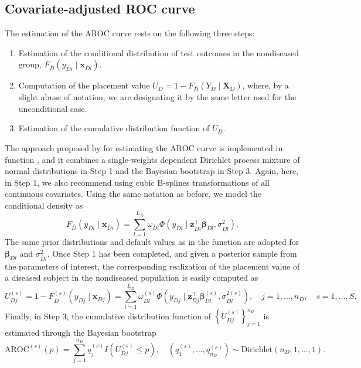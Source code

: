 \subsection{Covariate-adjusted ROC curve}\label{sec:AROC}
The estimation of the AROC curve rests on the following three steps:
\begin{enumerate}
\item Estimation of the conditional distribution of test outcomes in the nondiseased group, $F_{\bar{D}}(y_{\bar{D}i}\mid\mathbf{x}_{\bar{D}i})$.
\item Computation of the placement value $U_D=1-F_{\bar{D}}(Y_D\mid\mathbf{X}_D)$, where, by a slight abuse of notation, we are designating it by the same letter used for the unconditional case.
\item Estimation of the cumulative distribution function of $U_D$. 
\end{enumerate}	
The approach proposed by \cite{Inacio18} for estimating the AROC curve is implemented in function , and it combines a single-weights dependent Dirichlet process mixture of normal distributions in Step 1 and the Bayesian bootstrap in Step 3. Again, here, in Step 1, we also recommend using cubic B-splines transformations of all continuous covariates. Using the same notation as before, we model the conditional density as
\begin{equation*}
F_{\bar{D}}(y_{\bar{D}i}\mid\mathbf{x}_{\bar{D}i})=\sum_{l=1}^{L_{\bar{D}}}\omega_{\bar{D}l}\Phi(y_{\bar{D}i}\mid\mathbf{z}_{\bar{D}i}^{\top}\boldsymbol{\beta}_{\bar{D}l},\sigma_{\bar{D}l}^2).
\end{equation*}
The same prior distributions and default values as in the  function are adopted for $\boldsymbol{\beta}_{\bar{D}l}$ and $\sigma_{\bar{D}l}^2$. Once Step 1 has been completed, and given a posterior sample from the parameters of interest, the corresponding realization of the placement value of a diseased subject in the nondiseased population is easily computed as
\begin{equation*}
U_{Dj}^{(s)}=1-F_{\bar{D}}^{(s)}(y_{Dj}\mid\mathbf{x}_{Dj})=\sum_{l=1}^{L_{\bar{D}}}\omega_{\bar{D}l}^{(s)}\Phi\left(y_{Dj}\mid\mathbf{z}_{Dj}^{\top}\boldsymbol{\beta}_{\bar{D}l}^{(s)},\sigma_{\bar{D}l}^{2(s)}\right), \quad j =1,\ldots,n_D,\quad s=1,\ldots, S.
\end{equation*}
Finally, in Step 3, the cumulative distribution function of $\left\{U_{Dj}^{(s)}\right\}_{j=1}^{n_D}$ is estimated through the Bayesian bootstrap
\begin{equation*}
\text{AROC}^{(s)}(p)=\sum_{j=1}^{n_D}q_{j}^{(s)}I\left(U_{Dj}^{(s)}\leq p\right),\quad (q_{1}^{(s)},\ldots,q_{n_{D}}^{(s)})\sim\text{Dirichlet}(n_D; 1,\ldots,1).
\end{equation*}
